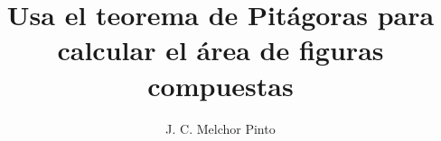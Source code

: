 \documentclass[12pt]{guia}
\title{Usa el teorema de Pitágoras para calcular el área de figuras compuestas}
\author{J. C. Melchor Pinto}
\begin{document}
\pagestyle{headandfoot}
\addpoints
\INFO
\printanswers

\newpage
\begin{questions}
    \questionboxed[10] 
    \questionboxed[10] 
    \questionboxed[10] 
    \questionboxed[10] 
    \questionboxed[10] 
\end{questions}
\end{document}
